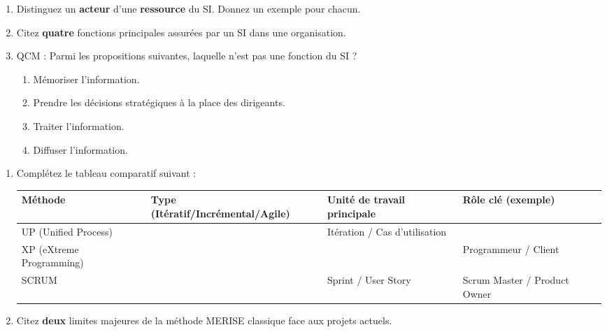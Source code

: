 \documentclass[11pt]{article}
\begin{document}
\begin{exercice}
\begin{enumerate}
    \item Distinguez un \textbf{acteur} d'une \textbf{ressource} du SI. Donnez un exemple pour chacun.
    \item Citez \textbf{quatre} fonctions principales assurées par un SI dans une organisation.
    \item QCM : Parmi les propositions suivantes, laquelle n'est pas une fonction du SI ?
    \begin{enumerate}
        \item Mémoriser l'information.
        \item Prendre les décisions stratégiques à la place des dirigeants.
        \item Traiter l'information.
        \item Diffuser l'information.
    \end{enumerate}
\end{enumerate}
\end{exercice}

\begin{exercice}
\begin{enumerate}
    \item Complétez le tableau comparatif suivant :
    \begin{tabular}{|l|l|l|l|}
    \hline
    \textbf{Méthode} & \textbf{Type (Itératif/Incrémental/Agile)} & \textbf{Unité de travail principale} & \textbf{Rôle clé (exemple)} \\ \hline
    UP (Unified Process) & & Itération / Cas d'utilisation & \\ \hline
    XP (eXtreme Programming) & & & Programmeur / Client \\ \hline
    SCRUM & & Sprint / User Story & Scrum Master / Product Owner \\ \hline
    \end{tabular}
    \item Citez \textbf{deux} limites majeures de la méthode MERISE classique face aux projets actuels.
\end{enumerate}
\end{exercice}
\end{document}
